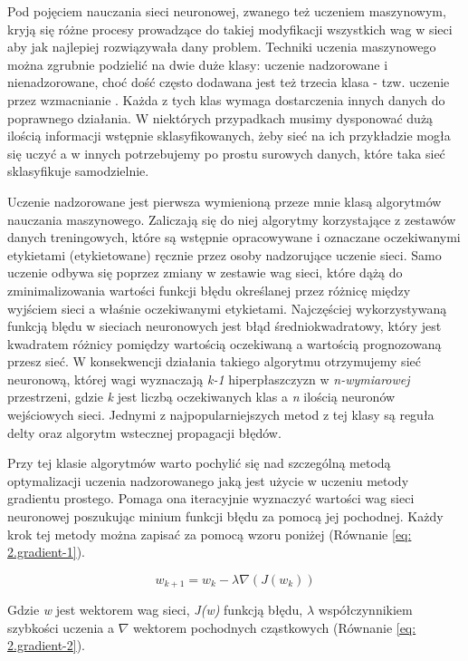 \documentclass[12pt, oneside, a4paper]{report}
\begin{document}
Pod pojęciem nauczania sieci neuronowej, zwanego też uczeniem maszynowym, kryją się różne procesy prowadzące do takiej modyfikacji wszystkich wag w sieci aby jak najlepiej rozwiązywała dany problem. Techniki uczenia maszynowego można zgrubnie podzielić na dwie duże klasy: uczenie nadzorowane i nienadzorowane, choć dość często dodawana jest też trzecia klasa - tzw. uczenie przez wzmacnianie \citep{roelants2017deeplearning}. Każda z tych klas wymaga dostarczenia innych danych do poprawnego działania. W niektórych przypadkach musimy dysponować dużą ilością informacji wstępnie sklasyfikowanych, żeby sieć na ich przykładzie mogła się uczyć a w innych potrzebujemy po prostu surowych danych, które taka sieć sklasyfikuje samodzielnie.

Uczenie nadzorowane jest pierwsza wymienioną przeze mnie klasą algorytmów nauczania maszynowego. Zaliczają się do niej algorytmy korzystające z zestawów danych treningowych, które są wstępnie opracowywane i oznaczane oczekiwanymi etykietami (etykietowane) ręcznie przez osoby nadzorujące uczenie sieci. Samo uczenie odbywa się poprzez zmiany w zestawie wag sieci, które dążą do zminimalizowania wartości funkcji błędu określanej przez różnicę między wyjściem sieci a właśnie oczekiwanymi etykietami. Najczęściej wykorzystywaną funkcją blędu w sieciach neuronowych jest błąd średniokwadratowy, który jest kwadratem różnicy pomiędzy wartością oczekiwaną a wartością prognozowaną przesz sieć. W konsekwencji działania takiego algorytmu otrzymujemy sieć neuronową, której wagi wyznaczają \textit{k-1} hiperpłaszczyzn w \textit{n-wymiarowej} przestrzeni, gdzie \textit{k} jest liczbą oczekiwanych klas a \textit{n} ilością neuronów wejściowych sieci. Jednymi z najpopularniejszych metod z tej klasy są reguła delty oraz algorytm wstecznej propagacji błędów.

Przy tej klasie algorytmów warto pochylić się nad szczególną metodą optymalizacji uczenia nadzorowanego jaką jest użycie w uczeniu metody gradientu prostego. Pomaga ona iteracyjnie wyznaczyć wartości wag sieci neuronowej poszukując minium funkcji błędu za pomocą jej pochodnej. Każdy krok tej metody można zapisać za pomocą wzoru poniżej (Równanie \ref{eq: 2.gradient-1}).

\begin{equation}\label{eq: 2.gradient-1}
	w_{k+1} = w_k - \lambda \nabla (J(w_k))
\end{equation}

Gdzie \textit{w} jest wektorem wag sieci, \textit{J(w)} funkcją błędu, $\lambda$ współczynnikiem szybkości uczenia a $\nabla$ wektorem pochodnych cząstkowych (Równanie \ref{eq: 2.gradient-2}).
\end{document}
